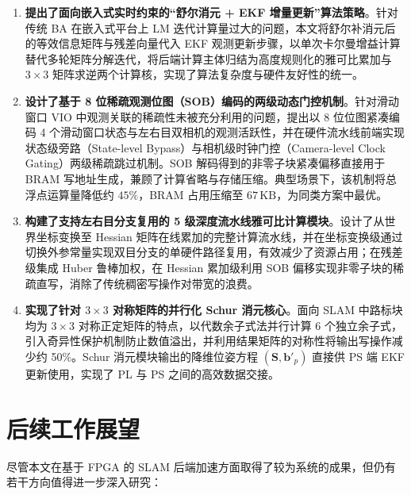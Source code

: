 \begin{enumerate}
    \item \textbf{提出了面向嵌入式实时约束的“舒尔消元 + EKF 增量更新”算法策略}。针对传统 BA 在嵌入式平台上 LM 迭代计算量过大的问题，本文将舒尔补消元后的等效信息矩阵与残差向量代入 EKF 观测更新步骤，以单次卡尔曼增益计算替代多轮矩阵分解迭代，将后端计算主体归结为高度规则化的雅可比累加与 $3 \times 3$ 矩阵求逆两个计算核，实现了算法复杂度与硬件友好性的统一。

    \item \textbf{设计了基于 8 位稀疏观测位图（SOB）编码的两级动态门控机制}。针对滑动窗口 VIO 中观测关联的稀疏性未被充分利用的问题，提出以 8 位位图紧凑编码 4 个滑动窗口状态与左右目双相机的观测活跃性，并在硬件流水线前端实现状态级旁路（State-level Bypass）与相机级时钟门控（Camera-level Clock Gating）两级稀疏跳过机制。SOB 解码得到的非零子块紧凑偏移直接用于 BRAM 写地址生成，兼顾了计算省略与存储压缩。典型场景下，该机制将总浮点运算量降低约 $45\%$，BRAM 占用压缩至 $67\,\mathrm{KB}$，为同类方案中最优。

    \item \textbf{构建了支持左右目分支复用的 5 级深度流水线雅可比计算模块}。设计了从世界坐标变换至 Hessian 矩阵在线累加的完整计算流水线，并在坐标变换级通过切换外参常量实现双目分支的单硬件路径复用，有效减少了资源占用；在残差级集成 Huber 鲁棒加权，在 Hessian 累加级利用 SOB 偏移实现非零子块的稀疏直写，消除了传统稠密写操作对带宽的浪费。

    \item \textbf{实现了针对 $3 \times 3$ 对称矩阵的并行化 Schur 消元核心}。面向 SLAM 中路标块均为 $3 \times 3$ 对称正定矩阵的特点，以代数余子式法并行计算 6 个独立余子式，引入奇异性保护机制防止数值溢出，并利用结果矩阵的对称性将输出写操作减少约 50\%。Schur 消元模块输出的降维位姿方程 $(\mathbf{S}, \mathbf{b}'_p)$ 直接供 PS 端 EKF 更新使用，实现了 PL 与 PS 之间的高效数据交接。
\end{enumerate}

\section{后续工作展望}

尽管本文在基于 FPGA 的 SLAM 后端加速方面取得了较为系统的成果，但仍有若干方向值得进一步深入研究：

